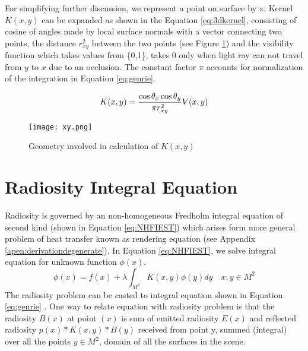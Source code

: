 For simplifying further discussion, we represent a point on surface by x. Kernel $K(x,y)$ can be expanded as shown in the Equation \ref{eq:3dkernel}, consisting of cosine of angles made by local surface normals with a vector connecting two points, the distance  $r_{xy}^{2}$ between the two points (see Figure \ref{fig:xytheta}) and the visibility function which takes values from \{0,1\}, takes $0$ only when light ray can not travel from $y$ to $x$ due to an occlusion. The constant factor $\pi$ accounts for normalization of the integration in Equation  \ref{eq:genrie}. 


\begin{equation} \label{eq:3dkernel}
K(x,y) =  \frac{\cos \theta_x \cos \theta_y} {\pi r_{xy}^{2}} V(x,y) \\ 
\end{equation}


\begin{figure}[h]
\centering
\texttt{[image: xy.png]}
\caption{Geometry involved in calculation of $K(x,y)$}
\label{fig:xytheta}
\end{figure}

\section {Radiosity Integral Equation}
Radiosity is governed by an non-homogeneous Fredholm integral equation of second kind (shown in Equation \ref{eq:NHFIEST}) which arises form more general problem of heat transfer known as rendering equation \cite{Kajiya} (see Appendix \ref{apen:derivationdegenerate}). In Equation \ref{eq:NHFIEST}, we solve integral equation for unknown function $\phi(x)$. 
\begin{equation} \label{eq:NHFIEST}
\phi(x)=f(x)+\lambda\int_{M^2} K(x,y)\phi(y)dy\quad x,y \in M^2
\end{equation}
The radiosity  problem can be casted to integral equation shown in Equation \ref{eq:genrie} \cite{Kajiya}. One way to relate equation with radiosity problem is that the radiosity $B(x)$ at point $(x)$  is sum of emitted radiosity $E(x)$ and reflected radiosity $p(x)*K(x,y)*B(y)$ received from point y, summed (integral) over all the points $y \in M^2$,  domain of all the surfaces in the scene.


